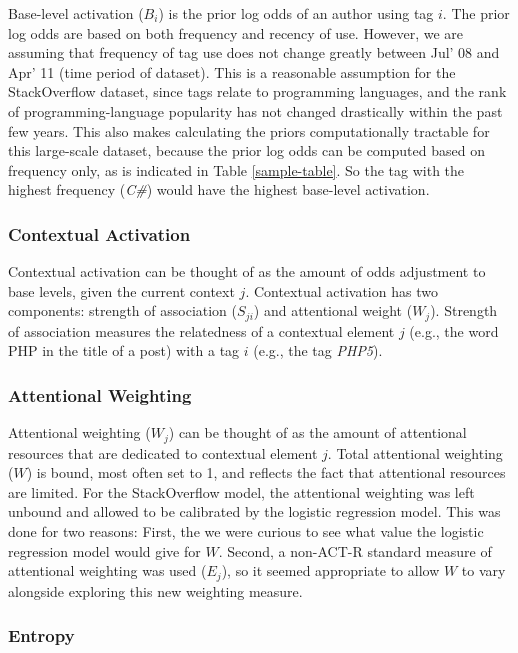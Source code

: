 \documentclass[10pt,letterpaper]{article}
\begin{document}
Base-level activation ($B_{i}$) is the prior log odds of an author using tag $i$.
The prior log odds are based on both frequency and recency of use.
However, we are assuming that frequency of tag use does not change greatly between Jul' 08 and Apr' 11 (time period of dataset).
This is a reasonable assumption for the StackOverflow dataset, since tags relate to programming languages, and the rank of programming-language popularity has not changed drastically within the past few years.
This also makes calculating the priors computationally tractable for this large-scale dataset, because the prior log odds can be computed based on frequency only, as is indicated in Table \ref{sample-table}.
So the tag with the highest frequency (\emph{C\#}) would have the highest base-level activation.

\subsubsection{Contextual Activation}

Contextual activation can be thought of as the amount of odds adjustment to base levels, given the current context $j$.
Contextual activation has two components: strength of association ($S_{ji}$) and attentional weight ($W_{j}$).
Strength of association measures the relatedness of a contextual element $j$ (e.g., the word PHP in the title of a post) with a tag $i$ (e.g., the tag \emph{PHP5}).

\subsubsection{Attentional Weighting}

Attentional weighting ($W_{j}$) can be thought of as the amount of attentional resources that are dedicated to contextual element $j$.
Total attentional weighting ($W$) is bound, most often set to 1, and reflects the fact that attentional resources are limited.
For the StackOverflow model, the attentional weighting was left unbound and allowed to be calibrated by the logistic regression model.
This was done for two reasons:
First, the we were curious to see what value the logistic regression model would give for $W$.
Second, a non-ACT-R standard measure of attentional weighting was used ($E_{j}$), so it seemed appropriate to allow $W$ to vary alongside exploring this new weighting measure.

\subsubsection{Entropy}
\end{document}
